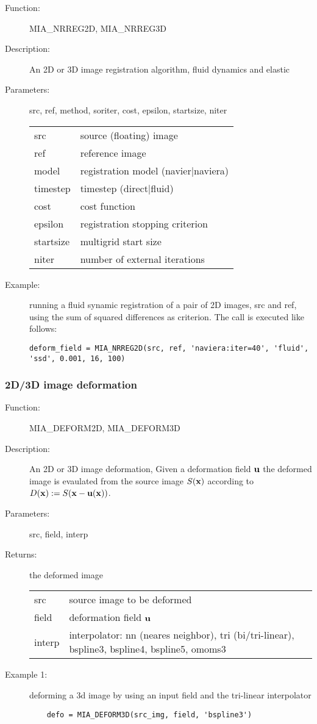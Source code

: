 \begin{description}
\item [Function:] MIA\_NRREG2D, MIA\_NRREG3D
\item [Description:] An 2D or 3D image registration algorithm, fluid dynamics and elastic
\item [Parameters:] src, ref, method, soriter, cost, epsilon, startsize, niter

\begin{tabular}{ll}
src & source (floating) image \\
ref & reference image \\
model & registration model (navier|naviera)\\
timestep & timestep (direct|fluid) \\
cost & cost function \\
epsilon & registration stopping criterion \\
startsize & multigrid start size \\
niter & number of external iterations  \\
\end{tabular}
\item [Example:] running a fluid synamic registration of a pair of 2D images, src and ref, using the sum of 
  squared differences as criterion. The call is executed like follows:
\begin{lstlisting}
deform_field = MIA_NRREG2D(src, ref, 'naviera:iter=40', 'fluid', 'ssd', 0.001, 16, 100)
\end{lstlisting}
\end{description}

\subsubsection*{2D/3D image deformation}

\begin{description}
\item [Function:] MIA\_DEFORM2D, MIA\_DEFORM3D
\item [Description:] An 2D or 3D image deformation, Given a deformation field $\mathbf{u}$ the deformed image is
   evaulated from the source image $S(\mathbf{x})$ according to $D(\mathbf{x}) := S(\mathbf{x} - \mathbf{u}(\mathbf{x}))$. 
\item [Parameters:] src, field, interp
\item [Returns:] the deformed image

\begin{tabular}{ll}
src & source image  to be deformed \\
field & deformation field $\mathbf{u}$ \\
interp & interpolator: nn (neares neighbor), tri (bi/tri-linear), bspline3, bspline4, bspline5, omoms3\\
\end{tabular}
\item [Example 1:] deforming a 3d image by using an input field and the tri-linear interpolator
\begin{lstlisting}
    defo = MIA_DEFORM3D(src_img, field, 'bspline3')
\end{lstlisting}
\end{description}


